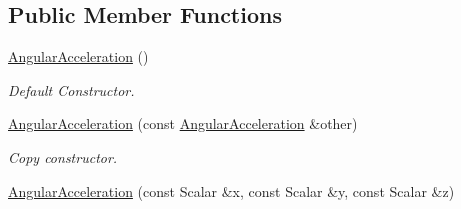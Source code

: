 \subsection*{Public Member Functions}
\begin{DoxyCompactItemize}
\item 
\hyperlink{classow__core_1_1AngularAcceleration_a24b5ba9e746b1056afa617dc35cc1909}{Angular\+Acceleration} ()\hypertarget{classow__core_1_1AngularAcceleration_a24b5ba9e746b1056afa617dc35cc1909}{}\label{classow__core_1_1AngularAcceleration_a24b5ba9e746b1056afa617dc35cc1909}

\begin{DoxyCompactList}\small\item\em Default Constructor. \end{DoxyCompactList}\item 
\hyperlink{classow__core_1_1AngularAcceleration_a4a2d1409f56a6200ce22e7774e6b85fb}{Angular\+Acceleration} (const \hyperlink{classow__core_1_1AngularAcceleration}{Angular\+Acceleration} \&other)\hypertarget{classow__core_1_1AngularAcceleration_a4a2d1409f56a6200ce22e7774e6b85fb}{}\label{classow__core_1_1AngularAcceleration_a4a2d1409f56a6200ce22e7774e6b85fb}

\begin{DoxyCompactList}\small\item\em Copy constructor. \end{DoxyCompactList}\item 
\hyperlink{classow__core_1_1AngularAcceleration_a3091dac3c3ba75b079b2f38675c735fb}{Angular\+Acceleration} (const Scalar \&x, const Scalar \&y, const Scalar \&z)\hypertarget{classow__core_1_1AngularAcceleration_a3091dac3c3ba75b079b2f38675c735fb}{}\label{classow__core_1_1AngularAcceleration_a3091dac3c3ba75b079b2f38675c735fb}


\end{DoxyCompactItemize}
